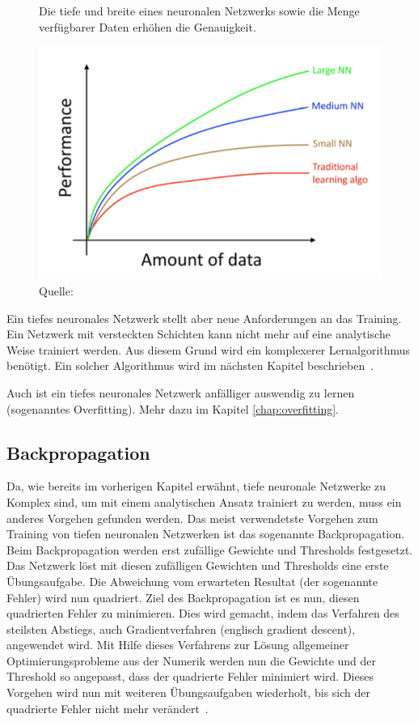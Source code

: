 \begin{figure}[h]
    \captionsetup{width=.9\linewidth}
    \caption[Verhältniss der verfügbaren Daten und der Genauigkeit unterschiedlich grosser neuronaler Netze]{Die tiefe und breite eines neuronalen Netzwerks sowie die Menge verfügbarer Daten erhöhen die Genauigkeit.}
    \label{scale-drives-ml-progress}
    \centering
    \includegraphics[width=0.4\linewidth]{graphics/scale-drives-ml-progress.png}
    \caption*{Quelle: \textcite{MLYearning}}
\end{figure}

Ein tiefes neuronales Netzwerk stellt aber neue Anforderungen an das Training. Ein Netzwerk mit versteckten Schichten kann nicht mehr auf eine analytische Weise trainiert werden. Aus diesem Grund wird ein komplexerer Lernalgorithmus benötigt. Ein solcher Algorithmus wird im nächsten Kapitel beschrieben~\autocite{Krogh2008}. 

Auch ist ein tiefes neuronales Netzwerk anfälliger auswendig zu lernen (sogenanntes Overfitting). Mehr dazu im Kapitel \ref{chap:overfitting}.

\subsection{Backpropagation}
\label{chap:backpropagation}

Da, wie bereits im vorherigen Kapitel erwähnt, tiefe neuronale Netzwerke zu Komplex sind, um mit einem analytischen Ansatz trainiert zu werden, muss ein anderes Vorgehen gefunden werden. Das meist verwendetste Vorgehen zum Training von tiefen neuronalen Netzwerken ist das sogenannte Backpropagation. Beim Backpropagation werden erst zufällige Gewichte und Thresholds festgesetzt. Das Netzwerk löst mit diesen zufälligen Gewichten und Thresholds eine erste Übungsaufgabe. Die Abweichung vom erwarteten Resultat (der sogenannte Fehler) wird nun quadriert. Ziel des Backpropagation ist es nun, diesen quadrierten Fehler zu minimieren. Dies wird gemacht, indem das Verfahren des steilsten Abstiegs, auch Gradientverfahren (englisch gradient descent), angewendet wird. Mit Hilfe dieses Verfahrens zur Lösung allgemeiner Optimierungsprobleme aus der Numerik werden nun die Gewichte und der Threshold so angepasst, dass der quadrierte Fehler minimiert wird. Dieses Vorgehen wird nun mit weiteren Übungsaufgaben wiederholt, bis sich der quadrierte Fehler nicht mehr verändert~\autocite{Krogh2008}.

